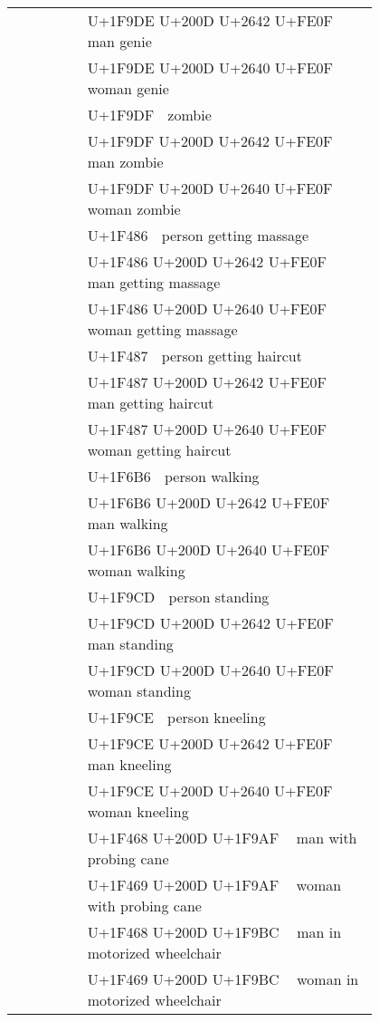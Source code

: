 \documentclass[a4paper,12pt]{ltjarticle}
\newcommand{\fontA}[1]{{\fontspec[RawFeature={mode=harf,+dist,+ccmp}]{Segoe UI Emoji} #1}}
\newcommand{\fontB}[1]{{\fontspec[RawFeature={mode=harf,+dist,+ccmp}]{Noto Color Emoji} #1}}
\begin{document}
\begin{longtable}[c]{ccp{0.8\linewidth}}
\fontA{🧞‍♂️}&\fontB{🧞‍♂️}&U+1F9DE U+200D U+2642 U+FE0F 🧞‍♂️ man genie\\
\fontA{🧞‍♀️}&\fontB{🧞‍♀️}&U+1F9DE U+200D U+2640 U+FE0F 🧞‍♀️ woman genie\\
\fontA{🧟}&\fontB{🧟}&U+1F9DF 🧟 zombie\\
\fontA{🧟‍♂️}&\fontB{🧟‍♂️}&U+1F9DF U+200D U+2642 U+FE0F 🧟‍♂️ man zombie\\
\fontA{🧟‍♀️}&\fontB{🧟‍♀️}&U+1F9DF U+200D U+2640 U+FE0F 🧟‍♀️ woman zombie\\
\fontA{💆}&\fontB{💆}&U+1F486 💆 person getting massage\\
\fontA{💆‍♂️}&\fontB{💆‍♂️}&U+1F486 U+200D U+2642 U+FE0F 💆‍♂️ man getting massage\\
\fontA{💆‍♀️}&\fontB{💆‍♀️}&U+1F486 U+200D U+2640 U+FE0F 💆‍♀️ woman getting massage\\
\fontA{💇}&\fontB{💇}&U+1F487 💇 person getting haircut\\
\fontA{💇‍♂️}&\fontB{💇‍♂️}&U+1F487 U+200D U+2642 U+FE0F 💇‍♂️ man getting haircut\\
\fontA{💇‍♀️}&\fontB{💇‍♀️}&U+1F487 U+200D U+2640 U+FE0F 💇‍♀️ woman getting haircut\\
\fontA{🚶}&\fontB{🚶}&U+1F6B6 🚶 person walking\\
\fontA{🚶‍♂️}&\fontB{🚶‍♂️}&U+1F6B6 U+200D U+2642 U+FE0F 🚶‍♂️ man walking\\
\fontA{🚶‍♀️}&\fontB{🚶‍♀️}&U+1F6B6 U+200D U+2640 U+FE0F 🚶‍♀️ woman walking\\
\fontA{🧍}&\fontB{🧍}&U+1F9CD 🧍 person standing\\
\fontA{🧍‍♂️}&\fontB{🧍‍♂️}&U+1F9CD U+200D U+2642 U+FE0F 🧍‍♂️ man standing\\
\fontA{🧍‍♀️}&\fontB{🧍‍♀️}&U+1F9CD U+200D U+2640 U+FE0F 🧍‍♀️ woman standing\\
\fontA{🧎}&\fontB{🧎}&U+1F9CE 🧎 person kneeling\\
\fontA{🧎‍♂️}&\fontB{🧎‍♂️}&U+1F9CE U+200D U+2642 U+FE0F 🧎‍♂️ man kneeling\\
\fontA{🧎‍♀️}&\fontB{🧎‍♀️}&U+1F9CE U+200D U+2640 U+FE0F 🧎‍♀️ woman kneeling\\
\fontA{👨‍🦯}&\fontB{👨‍🦯}&U+1F468 U+200D U+1F9AF 👨‍🦯 man with probing cane\\
\fontA{👩‍🦯}&\fontB{👩‍🦯}&U+1F469 U+200D U+1F9AF 👩‍🦯 woman with probing cane\\
\fontA{👨‍🦼}&\fontB{👨‍🦼}&U+1F468 U+200D U+1F9BC 👨‍🦼 man in motorized wheelchair\\
\fontA{👩‍🦼}&\fontB{👩‍🦼}&U+1F469 U+200D U+1F9BC 👩‍🦼 woman in motorized wheelchair\\

\end{longtable}
\end{document}
